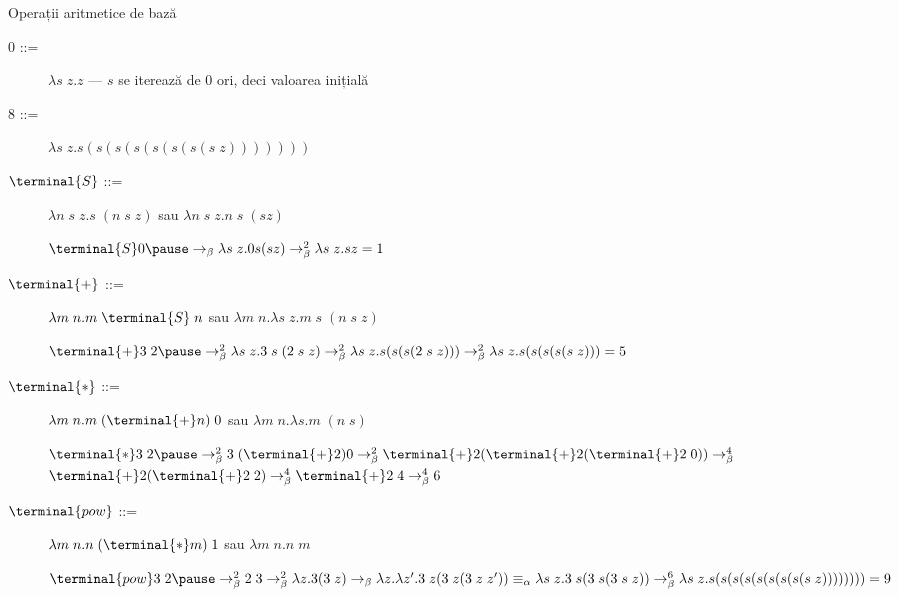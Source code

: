 \documentclass[xcolor=pdftex,romanian,colorlinks]{beamer}
\newcommand{\Splus}{\terminal{+}}
\newcommand{\Smul}{\terminal{*}}
\newcommand{\Ssucc}{\terminal{S}}
\newcommand{\Spow}{\terminal{pow}}
\begin{document}
\begin{frame}{Operații aritmetice de bază}
\begin{description}
  \item[0 ::=] $\lambda s\; z. z$
      --- $s$ se iterează de 0 ori, deci valoarea inițială
  \item[8 ::=] $\lambda s\; z. s (s (s (s (s (s (s (s\; z)))))))$
  \item[$\Ssucc$ ::=] $\lambda n\; s\; z.s\; (n\; s\; z)$ sau  $\lambda n\; s\; z.n\; s\; (s z)$
    
  $\Ssucc 0 \pause \rightarrow_\beta \lambda s\; z.0 s (s z) \rightarrow^2_\beta
    \lambda s\; z. s z
    = 1
  $
  \item[$\Splus$ ::=] $\lambda m\; n. m\; \Ssucc\; n$ sau $\lambda m\; n.\lambda s\; z.m\; s\; (n\; s\; z)$

  $\Splus 3\; 2 \pause \rightarrow^2_\beta \lambda s\; z.3\; s\; (2\; s\; z) \rightarrow^2_\beta \lambda s\; z. s (s (s (2\; s\; z))) \rightarrow^2_\beta
    \lambda s\; z. s (s (s (s (s\; z)))
    = 5
    $
  \item[$\Smul$ ::=] $\lambda m\; n. m\; (\Splus n)\; 0$ sau $\lambda m\; n.\lambda s.m\; (n\; s)$

  $\Smul 3\; 2 \pause \rightarrow^2_\beta 3\; (\Splus 2) 0 \rightarrow^2_\beta
    \Splus 2 (\Splus 2 (\Splus 2\; 0)) \rightarrow^4_\beta$ 
    $\Splus 2 (\Splus 2\; 2)  \rightarrow^4_\beta
     \Splus 2\; 4  \rightarrow^4_\beta 6$

  \item[$\Spow$ ::=] $\lambda m\; n. n\; (\Smul m)\; 1$ sau $\lambda m\; n.n\; m$

  $\Spow 3\; 2 \pause \rightarrow^2_\beta 2\; 3 \rightarrow^2_\beta
    \lambda z.3 (3\; z) \rightarrow_\beta
     \lambda z.\lambda z'.3\; z (3\; z (3\; z\; z')) \equiv_\alpha
     \lambda s\; z.3\; s (3\; s (3\; s\; z)) \rightarrow^6_\beta
     \lambda s\; z.s ( s ( s (s ( s ( s (s (s (s \; z))))))))
     = 9
  $
\end{description}
\end{frame}
\end{document}
